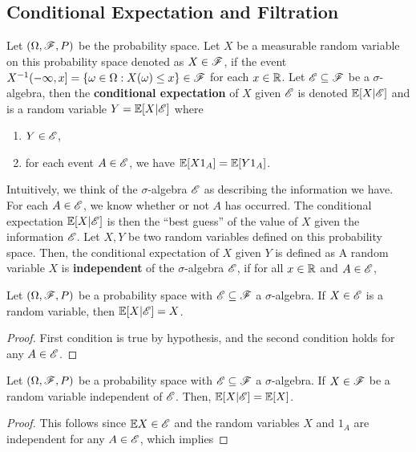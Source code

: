 \documentclass[letterpaper,10pt,english]{article}
\begin{document}
\subsection{Conditional Expectation and Filtration} 
Let $(\Omega, \mathscr{F}, P)$ be the probability space.  
Let $X$ be a measurable random variable on this probability space denoted as $X \in \mathscr{F}$, 
if the event $X^{-1}(-\infty, x] = \{\omega \in \Omega: X(\omega) \leq x\} \in \mathscr{F}$ for each $x \in \mathbb{R}$.  
Let $\mathscr{E} \subseteq \mathscr{F}$ be a $\sigma$-algebra, then the \textbf{conditional expectation} of $X$ given $\mathscr{E}$ is denoted $\mathbb{E}[X | \mathscr{E}]$ and is a random variable $Y = \mathbb{E}[X | \mathscr{E}]$ where
\begin{enumerate}[i\_] 
\item $Y \in \mathscr{E}$,
\item for each event $A \in \mathscr{E}$, we have $\mathbb{E} [X1_A] = \mathbb{E}[Y1_A]$. 
\end{enumerate}
Intuitively, we think of the $\sigma$-algebra $\mathscr{E}$ as describing the information we have. 
For each $A \in \mathscr{E}$, we know whether or not $A$ has occurred. 
The conditional expectation $\mathbb{E}[X|\mathscr{E}]$ is then the ``best guess'' of the value of $X$ given the information $\mathscr{E}$. 
Let $X,Y$ be two random variables defined on this probability space. 
Then, the conditional expectation of $X$ given $Y$ is defined as 
A random variable $X$ is \textbf{independent} of the $\sigma$-algebra $\mathscr{E}$, if for all $x \in \mathbb{R}$ and $A \in \mathscr{E}$, 
\begin{lem}
Let $(\Omega, \mathscr{F}, P)$ be a probability space with $\mathscr{E} \subseteq \mathscr{F}$ a $\sigma$-algebra. 
If $X \in \mathscr{E}$ is a random variable, then $\mathbb{E}[X| \mathscr{E}] = X$. 
\end{lem}
\begin{proof} 
First condition is true by hypothesis, and the second condition holds for any $A \in \mathscr{E}$. 
\end{proof}
\begin{lem} 
Let $(\Omega, \mathscr{F}, P)$ be a probability space with $\mathscr{E} \subseteq \mathscr{F}$ a $\sigma$-algebra. 
If $X \in \mathscr{F}$ be a random variable independent of $\mathscr{E}$.  
Then, $\mathbb{E}[X| \mathscr{E}]  = \mathbb{E}[X]$. 
\end{lem}
\begin{proof}
This follows since $\mathbb{E} X \in \mathscr{E}$ and the random variables $X$ and $1_{A}$ are independent for any $A \in \mathscr{E}$, 
which implies 
\end{proof}
\end{document}
